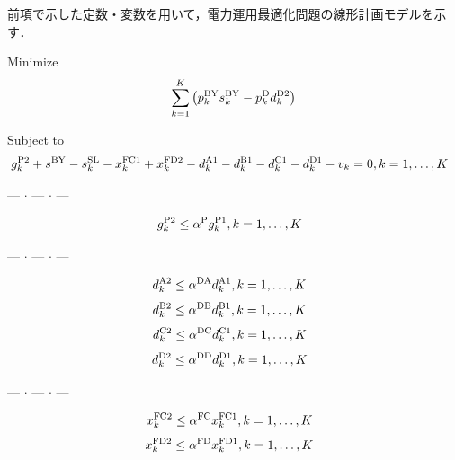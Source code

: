 \documentclass{jarticle}
\begin{document}
前項で示した定数・変数を用いて，電力運用最適化問題の線形計画モデルを示す．
%

\noindent
{\rm Minimize}
\begin{equation}
 \sum_{k=1}^{K} \left( p^{\rm BY}_{k}s^{\rm BY}_{k} - p^{\rm D}_{k}d^{\rm D2}_{k} \right)
 \label{eq:minimize}
\end{equation}

\noindent
{\rm Subject to}
%
\begin{equation}
 g^{\rm P2}_{k} + s^{\rm BY} - s^{\rm SL}_{k}
 - x^{\rm FC1}_{k} + x^{\rm FD2}_{k} 
 - d^{\rm A1}_{k} - d^{\rm B1}_{k} - d^{\rm C1}_{k} - d^{\rm D1}_{k} - v_{k} = 0,
 \hfill
 k=1,\ldots,K
~~
\end{equation}
%
\begin{center} --- $ \cdot $ --- $ \cdot $ --- \end{center}
%
\begin{equation}
 g^{\rm P2}_{k} \le \alpha^{\rm P} g^{\rm P1}_{k} ,
 \hfill
 k=1,\ldots,K
 ~~
 \label{eq:gP1gP2}
\end{equation}
%
\begin{center} --- $ \cdot $ --- $ \cdot $ --- \end{center}
%
\begin{equation}
 d^{\rm A2}_{k} \le \alpha^{\rm DA} d^{\rm A1}_{k} ,
 \hfill
 k=1,\ldots,K
~~
 \label{eq:dA1A2}
\end{equation}
%
\begin{equation}
 d^{\rm B2}_{k} \le \alpha^{\rm DB} d^{\rm B1}_{k},
 \hfill
 k=1,\ldots,K
~~
 \label{eq:dB1B2}
\end{equation}
%
\begin{equation}
 d^{\rm C2}_{k} \le \alpha^{\rm DC} d^{\rm C1}_{k},
 \hfill
 k=1,\ldots,K
~~
 \label{eq:dC1C2}
\end{equation}
%
\begin{equation}
 d^{\rm D2}_{k} \le \alpha^{\rm DD} d^{\rm D1}_{k},
 \hfill
 k=1,\ldots,K
~~
 \label{eq:dD1D2}
\end{equation}
%
\begin{center} --- $ \cdot $ --- $ \cdot $ --- \end{center}
%
\begin{equation}
 x^{\rm FC2}_{k} \le \alpha^{\rm FC}x^{\rm FC1}_{k},
 \hfill
 k=1,\ldots,K
~~
 \label{eq:xFC1FC2}
\end{equation}
%
\begin{equation}
 x^{\rm FD2}_{k} \le \alpha^{\rm FD} x^{\rm FD1}_{k} ,
 \hfill
 k=1,\ldots,K
~~
 \label{eq:FD1FD2}
\end{equation}
\end{document}
